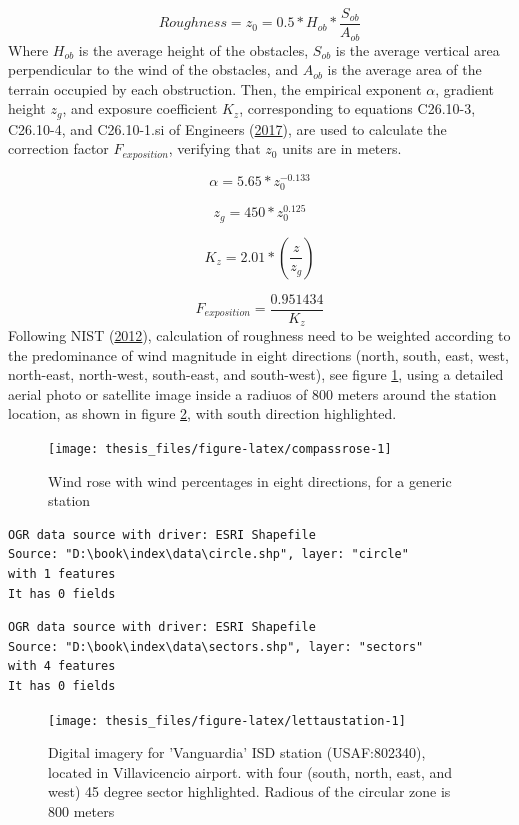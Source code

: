 \documentclass[12pt,oneside]{reedthesis}
\begin{document}
\[
Roughness = z_0= 0.5 * H_{ob}*\frac{S_{ob}}{A_{ob}}
\]
Where \(H_{ob}\) is the average height of the obstacles, \(S_{ob}\) is the average vertical area perpendicular to the wind of the obstacles, and \(A_{ob}\) is the average area of the terrain occupied by each obstruction. Then, the empirical exponent \(\alpha\), gradient height \(z_g\), and exposure coefficient \(K_z\), corresponding to equations C26.10-3, C26.10-4, and C26.10-1.si of Engineers (\protect\hyperlink{ref-Asce2017}{2017}), are used to calculate the correction factor \(F_{exposition}\), verifying that \(z_0\) units are in meters.

\[
\alpha =  5.65*z_0^{-0.133}
\]

\[
z_g=450*z_0^{0.125}
\]

\[
K_z= 2.01*\left(\frac{z}{z_g}\right)
\]

\[
F_{exposition} = \frac{0.951434}{K_z}
\]
Following NIST (\protect\hyperlink{ref-nist2012}{2012}), calculation of roughness need to be weighted according to the predominance of wind magnitude in eight directions (north, south, east, west, north-east, north-west, south-east, and south-west), see figure \ref{fig:compassrose}, using a detailed aerial photo or satellite image inside a radiuos of 800 meters around the station location, as shown in figure \ref{fig:lettaustation}, with south direction highlighted.
\begin{figure}

{\centering \texttt{[image: thesis\_files/figure-latex/compassrose-1]} 

}

\caption{Wind rose with wind percentages in eight directions, for a generic station}\label{fig:compassrose}
\end{figure}
\footnotesize
\begin{verbatim}
OGR data source with driver: ESRI Shapefile 
Source: "D:\book\index\data\circle.shp", layer: "circle"
with 1 features
It has 0 fields
\end{verbatim}
\begin{verbatim}
OGR data source with driver: ESRI Shapefile 
Source: "D:\book\index\data\sectors.shp", layer: "sectors"
with 4 features
It has 0 fields
\end{verbatim}
\begin{figure}

{\centering \texttt{[image: thesis\_files/figure-latex/lettaustation-1]} 

}

\caption{Digital imagery for 'Vanguardia' ISD station (USAF:802340), located in Villavicencio airport. with four (south, north, east, and west) 45 degree sector highlighted. Radious of the circular zone is 800 meters}\label{fig:lettaustation}
\end{figure}
\normalsize
\end{document}
